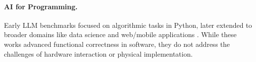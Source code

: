 \documentclass{article} %
\begin{document}
\paragraph{AI for Programming.}  
Early LLM benchmarks focused on algorithmic tasks in Python, later extended to broader domains like data science and web/mobile applications \citep{chen2021evaluating,austin2021program,hendrycks2021measuring,lai2023ds,zheng2024well}.
While these works advanced functional correctness in software, they do not address the challenges of hardware interaction or physical implementation.

\end{document}
